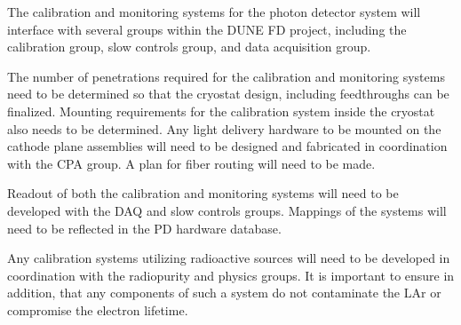 The calibration and monitoring systems for the photon detector system will interface with several groups within the DUNE FD project, including the calibration group, slow controls group, and data acquisition group.

The number of penetrations required for the calibration and monitoring systems need to be determined so that the cryostat design, including feedthroughs can be finalized. Mounting requirements for the calibration system inside the cryostat also needs to be determined. Any light delivery hardware to be mounted on the cathode plane assemblies will need to be designed and fabricated in coordination with the CPA group. A plan for fiber routing will need to be made. 

Readout of both the calibration and monitoring systems will need to be developed with the DAQ and slow controls groups. Mappings of the systems will need to be reflected in the PD hardware database.

Any calibration systems utilizing radioactive sources will need to be developed in coordination with the radiopurity and physics groups. It is important to ensure in addition, that any components of such a system do not contaminate the LAr or compromise the electron lifetime.

 

